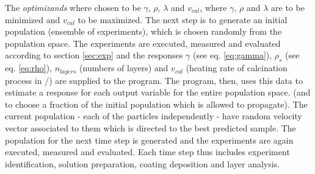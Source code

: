 The \textit{optimizands} where chosen to be $\gamma$, $\rho$, $\lambda$ and $v_{cal}$, 
where $\gamma$, $\rho$ and $\lambda$ are to be minimized and $v_{cal}$ to be maximized.
The next step is to generate an initial population (ensemble of experiments), which is chosen randomly from the population space. 
The experiments are executed, measured and evaluated according to section 
\ref{sec:exp} and the responses $\gamma$ (see eq. \ref{eq:gamma}), $\rho_s$ (see eq. \ref{eq:rho}), 
$n_{layers}$ (numbers of layers) and $v_{cal}$ (heating rate of calcination process in 
\oc{}/\minutes{}) are supplied to the program. 
The program, then, uses this data to estimate a response for each output variable 
for the entire population space.
(and to choose a fraction of the initial population which is allowed to propagate).
\td{
}
The current population - each of the particles independently - 
have random velocity vector associated to them which is directed to the best predicted sample. 
The population for the next time step is generated and the experiments are again executed, measured and evaluated.
Each time step thus includes experiment identification, solution preparation, coating deposition and layer analysis. 


\iffalse 
\subsection{Fitting via Machine Learning}
\td{scarce data may lead to overfitting\cite{Lecun1995conv}}\\
Python and sci-kit learn \td{cite} was used to implement a linear fit model, and SVR with the kernels polynomial, rbf and sigmoid. 
The space of hyper parameters C, the degree (in case of polynomial), epsilon and gamma was scaned. 

The independent variables are located on a partially irregular grid.  
\fi

